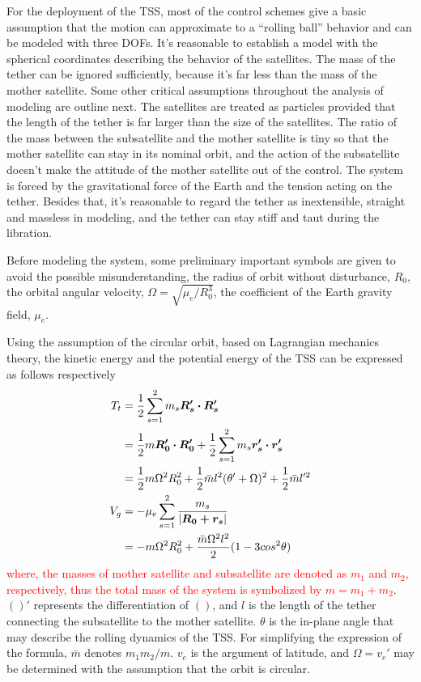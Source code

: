 \documentclass[3p]{elsarticle}
\theoremstyle{plain}
\begin{document}
For the deployment of the TSS, most of the control schemes give a basic assumption that the motion can approximate to a ``rolling ball'' behavior and can be modeled with three DOFs. It's reasonable to establish a model with the spherical coordinates describing the behavior of the satellites. The mass of the tether can be ignored sufficiently, because it's far less than the mass of the mother satellite. Some other critical assumptions throughout the analysis of modeling are outline next. The satellites are treated as particles provided that the length of the tether is far larger than the size of the satellites. The ratio of the mass between the subsatellite and the mother satellite is tiny so that the mother satellite can stay in its nominal orbit, and the action of the subsatellite doesn't make the attitude of the mother satellite out of the control. The system is forced by the gravitational force of the Earth and the tension acting on the tether. Besides that, it's reasonable to regard the tether as inextensible, straight and massless in modeling, and the tether can stay stiff and taut during the libration.\par
Before modeling the system, some preliminary important symbols are given to avoid the possible misunderstanding, the radius of orbit without disturbance, $R_0$, the orbital angular velocity, $\Omega=\sqrt{\mu_e/R_0^3}$, the coefficient of the Earth gravity field, $\mu_e$. \par
Using the assumption of the circular orbit, based on Lagrangian mechanics theory, the kinetic energy and the potential energy of the TSS can be expressed as follows respectively
\begin{align}
T_t
&= \frac{1}{2}\sum\limits_{s=1}^2 m_s\bm{R_s'\cdot R_s'}\notag\\
&= \frac{1}{2}m\bm{R_0'\cdot R_0'}+\frac{1}{2}\sum\limits_{s=1}^2 m_s\bm{r_s'\cdot r_s'}\notag\\
&= \frac{1}{2}m\Omega^2R_0^2+\frac{1}{2}\bar{m}l^2(\theta'+\Omega)^2+\frac{1}{2}\bar{m}l'^2\label{eq:Tt1}\\
V_g
&= -\mu_e\sum\limits_{s=1}^2\frac{m_s}{\vert \bm{R_0+r_s}\vert}\notag\\
&= -m\Omega^2R_0^2+\frac{\bar{m}\Omega^2l^2}{2}(1-3cos{^2\theta})\label{eq:Vg}
\end{align}
\textcolor{red}{where, the masses of mother satellite and subsatellite are denoted as $m_1$ and $m_2$, respectively, thus the total mass of the system is symbolized by $m=m_1+m_2$}. $()'$ represents the differentiation of $()$, and $l$ is the length of the tether connecting the subsatellite to the mother satellite. $\theta$ is the in-plane angle that may describe the rolling dynamics of the TSS. For simplifying the expression of the formula, $\bar{m}$ denotes $m_1m_2/m$. $v_e$ is the argument of latitude, and $\Omega = v_e'$ may be determined with the assumption that the orbit is circular.\par
\end{document}
